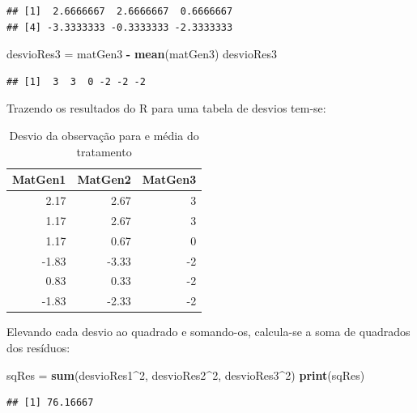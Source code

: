 \documentclass[
]{article}
\newenvironment{Shaded}{\begin{snugshade}}{\end{snugshade}}
\newcommand{\DecValTok}[1]{\textcolor[rgb]{0.00,0.00,0.81}{#1}}
\newcommand{\KeywordTok}[1]{\textcolor[rgb]{0.13,0.29,0.53}{\textbf{#1}}}
\newcommand{\NormalTok}[1]{#1}
\newcommand{\OperatorTok}[1]{\textcolor[rgb]{0.81,0.36,0.00}{\textbf{#1}}}
\newcommand{\StringTok}[1]{\textcolor[rgb]{0.31,0.60,0.02}{#1}}
\begin{document}
\begin{verbatim}
## [1]  2.6666667  2.6666667  0.6666667
## [4] -3.3333333 -0.3333333 -2.3333333
\end{verbatim}

\begin{Shaded}
\begin{Highlighting}[]
\NormalTok{desvioRes3 =}\StringTok{ }\NormalTok{matGen3 }\OperatorTok{-}\StringTok{ }\KeywordTok{mean}\NormalTok{(matGen3)}
\NormalTok{desvioRes3}
\end{Highlighting}
\end{Shaded}

\begin{verbatim}
## [1]  3  3  0 -2 -2 -2
\end{verbatim}

Trazendo os resultados do R para uma tabela de desvios tem-se:

\begin{table}

\caption{\label{tab:unnamed-chunk-22}Desvio da observação para e média do tratamento}
\centering
\begin{tabular}[t]{r|r|r}
\hline
MatGen1 & MatGen2 & MatGen3\\
\hline
2.17 & 2.67 & 3\\
\hline
1.17 & 2.67 & 3\\
\hline
1.17 & 0.67 & 0\\
\hline
-1.83 & -3.33 & -2\\
\hline
0.83 & 0.33 & -2\\
\hline
-1.83 & -2.33 & -2\\
\hline
\end{tabular}
\end{table}

Elevando cada desvio ao quadrado e somando-os, calcula-se a soma de quadrados dos resíduos:

\begin{Shaded}
\begin{Highlighting}[]
\NormalTok{sqRes =}\StringTok{ }\KeywordTok{sum}\NormalTok{(desvioRes1}\OperatorTok{^}\DecValTok{2}\NormalTok{, desvioRes2}\OperatorTok{^}\DecValTok{2}\NormalTok{, desvioRes3}\OperatorTok{^}\DecValTok{2}\NormalTok{)}
\KeywordTok{print}\NormalTok{(sqRes)}
\end{Highlighting}
\end{Shaded}

\begin{verbatim}
## [1] 76.16667
\end{verbatim}
\end{document}
